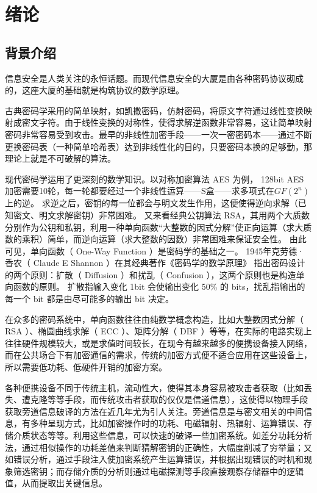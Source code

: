 
\chapter{绪论}
\section{背景介绍}\label{sec:background}
信息安全是人类关注的永恒话题。而现代信息安全的大厦是由各种密码协议砌成的，这座大厦的基础就是构筑协议的数学原理。

古典密码学采用的简单映射，如凯撒密码，仿射密码，将原文字符通过线性变换映射成密文字符。由于线性变换的对称性，使得求解逆函数非常容易，这让简单映射密码非常容易受到攻击。最早的非线性加密手段——一次一密密码本——通过不断更换密码表（一种简单哈希表）达到非线性化的目的，只要密码本换的足够勤，那理论上就是不可破解的算法。

现代密码学运用了更深刻的数学知识。以对称加密算法 AES 为例， 128bit AES 加密需要10轮，每一轮都要经过一个非线性运算——S盒——求多项式在$GF(2^n)$上的逆。
求逆之后，密钥的每一位都会与明文发生作用，这便使得逆向求解（已知密文、明文求解密钥）非常困难\supercite{rijmen2001advanced}。
又来看经典公钥算法 RSA，其用两个大质数分别作为公钥和私钥，利用一种单向函数``大整数的因式分解''使正向运算（求大质数的乘积）简单，而逆向运算（求大整数的因数）非常困难来保证安全性。
由此可见，单向函数（ One-Way Function ）是密码学的基础之一。
1945年克劳德·香农（ Claude E Shannon ）在其经典著作《密码学的数学原理》\supercite{shannon1945mathematical} 指出密码设计的两个原则：扩散（ Diffusion ）和扰乱（ Confusion ），这两个原则也是构造单向函数的原则。
扩散指输入变化 1bit 会使输出变化 50\% 的 bits，扰乱指输出的每一个 bit 都是由尽可能多的输出 bit 决定。

在众多的密码系统中，单向函数往往由纯数学概念构造，比如大整数因式分解（ RSA ）、椭圆曲线求解（ ECC ）、矩阵分解\supercite{wendt2013bidirectional}（ DBF ）等等，在实际的电路实现上往往硬件规模较大，或是求值时间较长，在现今有越来越多的便携设备接入网络，而在公共场合下有加密通信的需求，传统的加密方式便不适合应用在这些设备上，所以需要低功耗、低硬件开销的加密方案。

各种便携设备不同于传统主机，流动性大，使得其本身容易被攻击者获取（比如丢失、遭克隆等等手段，而传统攻击者获取的仅仅是信道信息），这使得以物理手段获取旁道信息破译的方法在近几年尤为引人关注。旁道信息是与密文相关的中间信息，有多种呈现方式，比如加密操作时的功耗、电磁辐射、热辐射、运算错误、存储介质状态等等\supercite{standaert2010introduction}。利用这些信息，可以快速的破译一些加密系统。如差分功耗分析法，通过相似操作的功耗差值来判断猜解密钥的正确性，大幅度削减了穷举量；又如错误分析，通过手段注入使加密系统产生运算错误，并根据出现错误的时机和现象筛选密钥；而存储介质的分析则通过电磁探测等手段直接观察存储器中的逻辑值，从而提取出关键信息。

